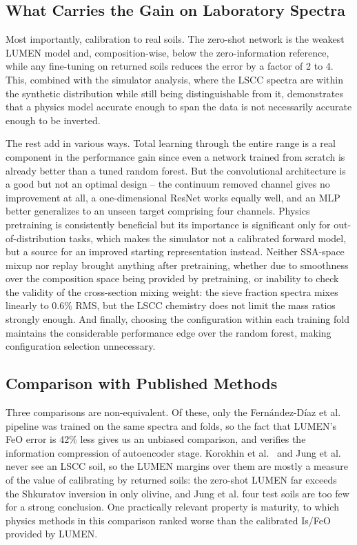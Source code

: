 \documentclass[remotesensing,article,submit,pdftex,moreauthors]{Definitions/mdpi}
\begin{document}
\subsection{What Carries the Gain on Laboratory Spectra}

Most importantly, calibration to real soils. The zero-shot network is the weakest LUMEN model and, composition-wise, below the zero-information reference, while any fine-tuning on returned soils reduces the error by a factor of 2 to 4. This, combined with the simulator analysis, where the LSCC spectra are within the synthetic distribution while still being distinguishable from it, demonstrates that a physics model accurate enough to span the data is not necessarily accurate enough to be inverted.

The rest add in various ways. Total learning through the entire range is a real component in the performance gain since even a network trained from scratch is already better than a tuned random forest. But the convolutional architecture is a good but not an optimal design -- the continuum removed channel gives no improvement at all, a one-dimensional ResNet works equally well, and an MLP better generalizes to an unseen target comprising four channels. Physics pretraining is consistently beneficial but its importance is significant only for out-of-distribution tasks, which makes the simulator not a calibrated forward model, but a source for an improved starting representation instead. Neither SSA-space mixup nor replay brought anything after pretraining, whether due to smoothness over the composition space being provided by pretraining, or inability to check the validity of the cross-section mixing weight: the sieve fraction spectra mixes linearly to 0.6\% RMS, but the LSCC chemistry does not limit the mass ratios strongly enough. And finally, choosing the configuration within each training fold maintains the considerable performance edge over the random forest, making configuration selection unnecessary.

\subsection{Comparison with Published Methods}

Three comparisons are non-equivalent. Of these, only the Fernández-Díaz et al.~\cite{fernandez2026} pipeline was trained on the same spectra and folds, so the fact that LUMEN's FeO error is 42\% less gives us an unbiased comparison, and verifies the information compression of autoencoder stage. Korokhin et al.~\cite{korokhin2024} and Jung et al.~\cite{jung2026} never see an LSCC soil, so the LUMEN margins over them are mostly a measure of the value of calibrating by returned soils: the zero-shot LUMEN far exceeds the Shkuratov inversion in only olivine, and Jung et al. four test soils are too few for a strong conclusion. One practically relevant property is maturity, to which physics methods in this comparison ranked worse than the calibrated Is/FeO provided by LUMEN.
\end{document}
